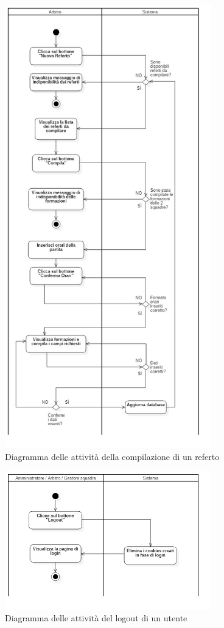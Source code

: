 %
%
\begin{figure}[h]
	\centering
	\includegraphics[width=0.8\textwidth]
	{immagini/ad-referto}
	
	\caption{Diagramma delle attività della compilazione di un referto}
	\label{ad-referto}
\end{figure}


%
%
\begin{figure}
	\centering
	\includegraphics[width=0.8\textwidth]
	{immagini/ad-logout}
	
	\caption{Diagramma delle attività del logout di un utente}
	\label{ad-logout}
\end{figure}